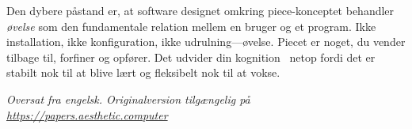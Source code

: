 \documentclass[10pt,letterpaper,twocolumn]{article}
\begin{document}
Den dybere påstand er, at software designet omkring piece-konceptet behandler \emph{øvelse} som den fundamentale relation mellem en bruger og et program. Ikke installation, ikke konfiguration, ikke udrulning---øvelse. Piecet er noget, du vender tilbage til, forfiner og opfører. Det udvider din kognition~\citep{clark1998extended} netop fordi det er stabilt nok til at blive lært og fleksibelt nok til at vokse.

\vspace{0.5em}\noindent\textit{Oversat fra engelsk. Originalversion tilgængelig på \url{https://papers.aesthetic.computer}}



\end{document}
